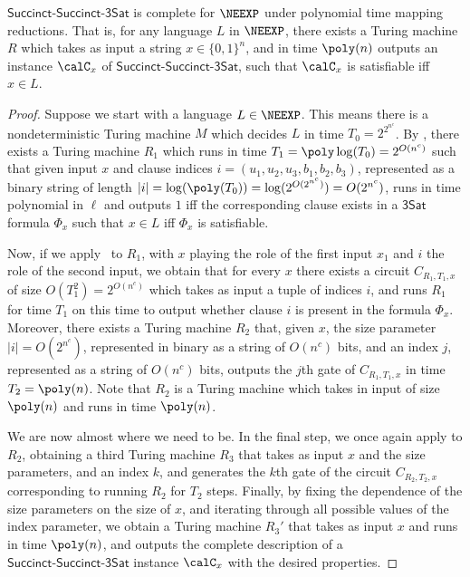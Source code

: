 \documentclass[11pt]{article}
\newcommand{\sat}{\mathsf{3Sat}}
\newcommand{\succinctsquared}{\mathsf{Succinct}\text{-}\mathsf{Succinct}\text{-}\mathsf{3Sat}}
\begin{document}
  
\begin{theorem}
  $\succinctsquared$ is complete for $\NEEXP$ under polynomial time
  mapping reductions. That is, for any language $L$ in $\NEEXP$,
  there exists a Turing machine $R$ which takes as input a string $x
  \in \{0,1\}^n$, and in time $\poly(n)$ outputs an instance $\calC_{x}$ of
  $\succinctsquared$, such that $\calC_{x}$ is satisfiable iff $x \in L$.
\end{theorem}
\begin{proof}
  Suppose we start with a language $L \in \NEEXP$. This means there is
  a nondeterministic Turing machine $M$ which decides $L$ in time
  $T_0 = 2^{2^{n^c}}$.
  By , there exists a Turing machine $R_1$
  which runs in time $T_1 = \poly\log(T_0) = 2^{O(n^c)}$ such that
  given input $x$ and clause indices $i = (u_1, u_2, u_3, b_1, b_2, b_3)$,
  represented as a binary string of length $|i| = \log(\poly(T_0)) =
  \log(2^{O(2^{n^c})}) = O(2^{n^c})$, runs in time polynomial in
  $\ell$ and outputs $1$ iff the corresponding clause exists in a
  $\sat$ formula  $\Phi_x$ such that $x \in L$ iff $\Phi_x$ is satisfiable. 

  Now, if we apply~ to $R_1$, with $x$ playing
  the role of the first input $x_1$ and $i$ the role of the second
  input, we obtain that for every $x$ there exists a circuit $C_{R_1, T_1,
    x}$ of size $O(T_1^2) = 2^{O(n^c)}$ which takes as input a tuple
  of indices $i$, and runs $R_1$ for time $T_1$ on this time to output
  whether clause $i$ is present in the formula $\Phi_x$. Moreover, there exists a
  Turing machine $R_2$ that, given $x$, the size parameter $|i| =
  O(2^{n^c})$, represented in binary as a string of $O(n^c)$ bits, and an index $j$, represented
  as a string of $O(n^c)$ bits, outputs
  the $j$th gate of $C_{R_1, T_1, x}$ in time $T_2 = \poly(n)$. Note that
  $R_2$ is a Turing machine which takes in input of size $\poly(n)$
  and runs in time $\poly(n)$.

  We are now almost where we need to be. In the final step, we once
  again apply  to $R_2$, obtaining a third Turing machine $R_3$
  that takes as input $x$ and the size parameters, and an index $k$,
  and generates the $k$th gate of the circuit $C_{R_2, T_2, x}$
  corresponding to running $R_2$ for $T_2$ steps. Finally, by
  fixing the dependence of the size parameters on the size of $x$, and
  iterating through all possible values of the index parameter, we
  obtain a Turing machine $R_3'$ that takes as input $x$ and runs in
  time $\poly(n)$, and outputs the complete description of a $\succinctsquared$ instance $\calC_x$
  with the desired properties.
\end{proof}
\end{document}
